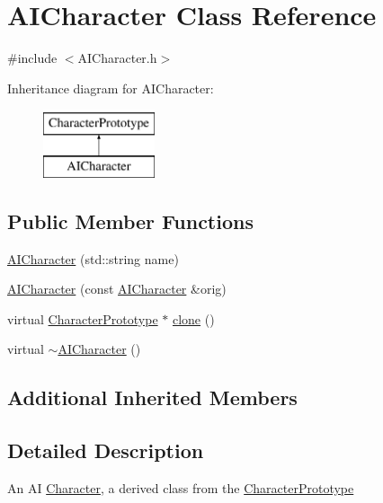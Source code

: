 \hypertarget{classAICharacter}{}\section{A\+I\+Character Class Reference}
\label{classAICharacter}


{\ttfamily \#include $<$A\+I\+Character.\+h$>$}

Inheritance diagram for A\+I\+Character\+:\begin{figure}[H]
\begin{center}
\leavevmode
\includegraphics[height=2.000000cm]{classAICharacter}
\end{center}
\end{figure}
\subsection*{Public Member Functions}
\begin{DoxyCompactItemize}
\item 
\hyperlink{classAICharacter_a915c9436182d94bf6f6e1f3ffb11a319}{A\+I\+Character} (std\+::string name)
\item 
\hyperlink{classAICharacter_a20f8f8c486041489b7790ee25d57901e}{A\+I\+Character} (const \hyperlink{classAICharacter}{A\+I\+Character} \&orig)
\item 
virtual \hyperlink{classCharacterPrototype}{Character\+Prototype} $\ast$ \hyperlink{classAICharacter_a99b6f645c4e1f24d9701bac8f0dee596}{clone} ()
\item 
virtual \hyperlink{classAICharacter_ac270cee21ac69ed829cfc7b3c7f4c1b7}{$\sim$\+A\+I\+Character} ()
\end{DoxyCompactItemize}
\subsection*{Additional Inherited Members}


\subsection{Detailed Description}
An AI \hyperlink{classCharacter}{Character}, a derived class from the \hyperlink{classCharacterPrototype}{Character\+Prototype} 

